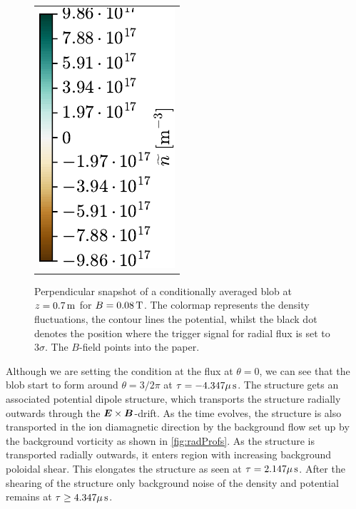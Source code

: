 \begin{figure}[h!]
\begin{tabular}{ccc}
  \multicolumn{3}{c}{\hspace*{2cm}\includegraphics[angle=-90]{fig/results/blobs/matrix-perp-blobs-B0_0.08-fluct/colorbar}}
  \\
\end{tabular}
\caption{Perpendicular snapshot of a conditionally averaged blob at $z=0.7\, \text{m}$ for $B=0.08\, \text{T}$.
    The colormap represents the density fluctuations, the contour lines the potential, whilst the black dot denotes the position where the trigger signal for radial flux is set to $3\sigma$.
    The $B$-field points into the paper.
}
\label{fig:perpBlob008}
\end{figure}
%
Although we are setting the condition at the flux at $\theta = 0$, we can see that the blob start to form around $\theta = 3/2 \pi$ at $\tau=-4.347\mu \, \text{s}$.
The structure gets an associated potential dipole structure, which transports the structure radially outwards through the $\boldsymbol{E}\times\boldsymbol{B}$-drift.
As the time evolves, the structure is also transported in the ion diamagnetic direction by the background flow set up by the background vorticity as shown in \cref{fig:radProfs}.
As the structure is transported radially outwards, it enters region with increasing background poloidal shear.
This elongates the structure as seen at $\tau=2.147\mu \, \text{s}$.
After the shearing of the structure only background noise of the density and potential remains at $\tau \geq4.347\mu \, \text{s}$.

